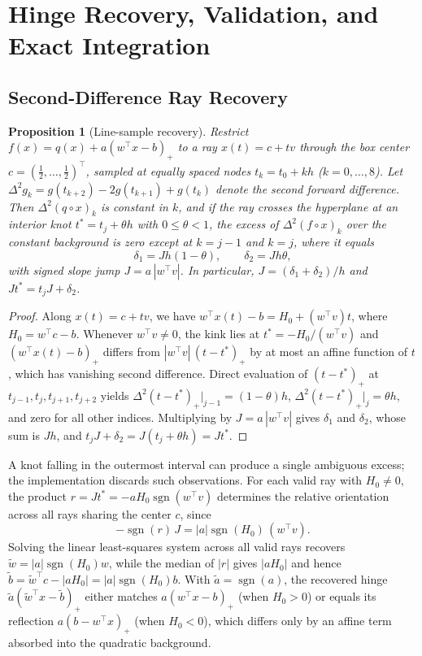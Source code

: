 \documentclass[10pt,letterpaper]{article}
\newtheorem{proposition}{Proposition}
\begin{document}
\section{Hinge Recovery, Validation, and Exact Integration}

\subsection{Second-Difference Ray Recovery}

\begin{proposition}[Line-sample recovery]
Restrict $f(x) = q(x) + a(w^\top x - b)_+$ to a ray $x(t) = c + t v$ through the box center $c = (\tfrac{1}{2},\dots,\tfrac{1}{2})^\top$, sampled at equally spaced nodes $t_k = t_0 + k h$ ($k=0,\dots,8$). Let $\Delta^2 g_k = g(t_{k+2}) - 2g(t_{k+1}) + g(t_k)$ denote the second forward difference. Then $\Delta^2 (q \circ x)_k$ is constant in $k$, and if the ray crosses the hyperplane at an interior knot $t^* = t_j + \theta h$ with $0 \leq \theta < 1$, the excess of $\Delta^2(f \circ x)_k$ over the constant background is zero except at $k = j-1$ and $k = j$, where it equals
\[
\delta_1 = J h (1 - \theta), \qquad \delta_2 = J h \theta,
\]
with signed slope jump $J = a\,|w^\top v|$. In particular, $J = (\delta_1 + \delta_2)/h$ and $J t^* = t_j J + \delta_2$.
\end{proposition}

\begin{proof}
Along $x(t) = c + tv$, we have $w^\top x(t) - b = H_0 + (w^\top v) t$, where $H_0 = w^\top c - b$. Whenever $w^\top v \neq 0$, the kink lies at $t^* = -H_0 / (w^\top v)$ and $(w^\top x(t) - b)_+$ differs from $|w^\top v|\,(t - t^*)_+$ by at most an affine function of $t$, which has vanishing second difference. Direct evaluation of $(t - t^*)_+$ at $t_{j-1}, t_j, t_{j+1}, t_{j+2}$ yields $\Delta^2(t - t^*)_+|_{j-1} = (1-\theta)h$, $\Delta^2(t - t^*)_+|_{j} = \theta h$, and zero for all other indices. Multiplying by $J = a\,|w^\top v|$ gives $\delta_1$ and $\delta_2$, whose sum is $Jh$, and $t_j J + \delta_2 = J(t_j + \theta h) = J t^*$.
\end{proof}

A knot falling in the outermost interval can produce a single ambiguous excess; the implementation discards such observations. For each valid ray with $H_0 \neq 0$, the product $r = J t^* = -a H_0 \operatorname{sgn}(w^\top v)$ determines the relative orientation across all rays sharing the center $c$, since
\[
-\operatorname{sgn}(r)\,J = |a|\operatorname{sgn}(H_0)\,(w^\top v).
\]
Solving the linear least-squares system across all valid rays recovers $\tilde{w} = |a|\operatorname{sgn}(H_0) w$, while the median of $|r|$ gives $|a H_0|$ and hence $\tilde{b} = \tilde{w}^\top c - |a H_0| = |a|\operatorname{sgn}(H_0) b$. With $\tilde{a} = \operatorname{sgn}(a)$, the recovered hinge $\tilde{a}(\tilde{w}^\top x - \tilde{b})_+$ either matches $a(w^\top x - b)_+$ (when $H_0 > 0$) or equals its reflection $a(b - w^\top x)_+$ (when $H_0 < 0$), which differs only by an affine term absorbed into the quadratic background.
\end{document}
